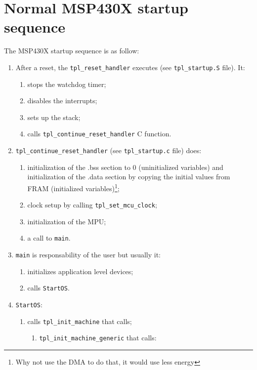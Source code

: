 \documentclass[11pt, oneside]{article}   	%
\begin{document}
\section{Normal MSP430X startup sequence}

The MSP430X startup sequence is as follow:
\begin{enumerate}
\item After a reset, the \lstinline{tpl_reset_handler} executes (see \lstinline{tpl_startup.S} file). It:
	\begin{enumerate}
	\item stops the watchdog timer;
	\item disables the interrupts;
	\item sets up the stack;
	\item calls \lstinline{tpl_continue_reset_handler} C function.
	\end{enumerate}
\item \lstinline{tpl_continue_reset_handler} (see \lstinline{tpl_startup.c} file) does:
	\begin{enumerate}
	\item initialization of the .bss section to 0 (uninitialized variables) and initialization of the .data section by copying the initial values from FRAM (initialized variables)\label{item:bssdatainit}\footnote{Why not use the DMA to do that, it would use less energy};
	\item clock setup by calling \lstinline{tpl_set_mcu_clock}\label{item:clockinit};
	\item initialization of the MPU\label{item:mpuinit}; 
	\item a call to \lstinline{main}\label{item:callmain}.
	\end{enumerate}
\item \lstinline{main} is responsability of the user but usually it:
	\begin{enumerate}
	\item initializes application level devices;
	\item calls \lstinline{StartOS}.
	\end{enumerate}
\item \lstinline{StartOS}:
	\begin{enumerate}
	\item calls \lstinline{tpl_init_machine} that calls;
		\begin{enumerate}
		\item \lstinline{tpl_init_machine_generic} that calls:
			\begin{enumerate}

\end{enumerate}
\end{enumerate}
\end{enumerate}
\end{enumerate}
\end{document}
